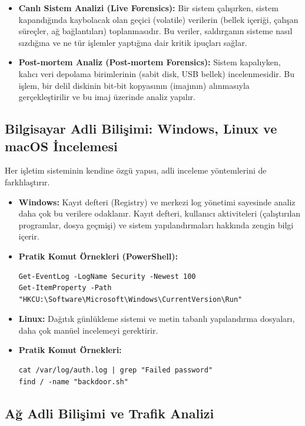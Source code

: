 \begin{itemize}
\begin{itemize}
    \item \textbf{Canlı Sistem Analizi (Live Forensics):} Bir sistem çalışırken, sistem kapandığında kaybolacak olan geçici (volatile) verilerin (bellek içeriği, çalışan süreçler, ağ bağlantıları) toplanmasıdır. Bu veriler, saldırganın sisteme nasıl sızdığına ve ne tür işlemler yaptığına dair kritik ipuçları sağlar.
    \item \textbf{Post-mortem Analiz (Post-mortem Forensics):} Sistem kapalıyken, kalıcı veri depolama birimlerinin (sabit disk, USB bellek) incelenmesidir. Bu işlem, bir delil diskinin bit-bit kopyasının (imajının) alınmasıyla gerçekleştirilir ve bu imaj üzerinde analiz yapılır.
\end{itemize}

\subsection{Bilgisayar Adli Bilişimi: Windows, Linux ve macOS İncelemesi}

Her işletim sisteminin kendine özgü yapısı, adli inceleme yöntemlerini de farklılaştırır.

\begin{itemize}
    \item \textbf{Windows:} Kayıt defteri (Registry) ve merkezi log yönetimi sayesinde analiz daha çok bu verilere odaklanır. Kayıt defteri, kullanıcı aktiviteleri (çalıştırılan programlar, dosya geçmişi) ve sistem yapılandırmaları hakkında zengin bilgi içerir.
    \item \textbf{Pratik Komut Örnekleri (PowerShell):}
    \begin{verbatim}
Get-EventLog -LogName Security -Newest 100
Get-ItemProperty -Path "HKCU:\Software\Microsoft\Windows\CurrentVersion\Run"
    \end{verbatim}
    \item \textbf{Linux:} Dağıtık günlükleme sistemi ve metin tabanlı yapılandırma dosyaları, daha çok manüel incelemeyi gerektirir.
    \item \textbf{Pratik Komut Örnekleri:}
    \begin{verbatim}
cat /var/log/auth.log | grep "Failed password"
find / -name "backdoor.sh"
    \end{verbatim}
\end{itemize}

\subsection{Ağ Adli Bilişimi ve Trafik Analizi}


\end{itemize}
